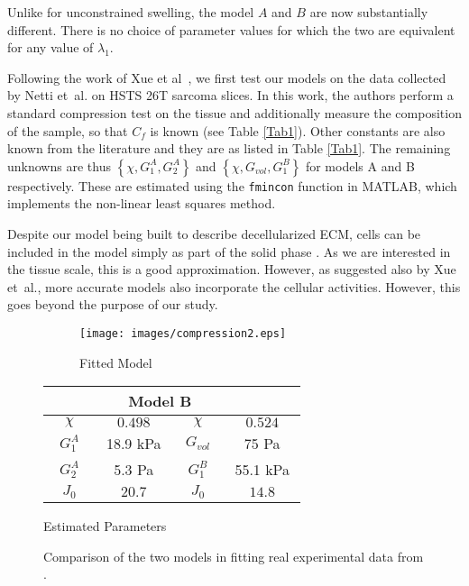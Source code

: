 Unlike for unconstrained swelling, the model $A$ and $B$ are now substantially different. There is no choice of parameter values for which the two are equivalent for any value of $\lambda_1$. 

Following the work of Xue et al~\cite{ecm2}, we first test our models on the data collected by Netti et~al. \cite{Netti} on HSTS 26T sarcoma slices. In this work, the authors perform a standard compression test on the tissue and additionally measure the composition of the sample, so that $C_f$ is known (see Table \ref{Tab1}). Other constants are also known from the literature and they are as listed in Table \ref{Tab1}. The remaining unknowns are thus $\left\{\chi, G^A_1, G^A_2\right\}$ and  $\left\{\chi, G_{vol}, G^B_1\right\}$ for models A and B respectively. These are estimated using the \texttt{fmincon} function in MATLAB, which implements the non-linear least squares method.

Despite our model being built to describe decellularized ECM, cells can be included in the model simply as part of the solid phase \cite{ecm2}. As we are interested in the tissue scale, this is a good approximation. However, as suggested also by Xue et~al.\cite{ecm2}, more accurate models also incorporate the cellular activities. However, this goes beyond the purpose of our study. 

\begin{figure}[h]
	\hspace{-8mm}
	\begin{subfigure}{0.62\textwidth}
		\hspace{2mm}
		\texttt{[image: images/compression2.eps]}
		\caption{Fitted Model}
		\label{fit}
	\end{subfigure}
	\begin{subtable}{0.375\textwidth}
		\begin{tabular}{c | c ||c| c }		
			\hline\addlinespace[2pt]
			\multicolumn{2}{c||}{Model A} &  \multicolumn{2}{c}{Model B}\\[0.5mm]
			\hline\addlinespace[2pt]
			$\quad \chi\quad$ & $\quad0.498\quad$ &$\quad \chi\quad$&$\quad0.524\quad$\\[0.5mm]
			$G^A_1$ & 18.9 kPa&$G_{vol}$&75 Pa\\[0.5mm]
			$G^A_2$ & 5.3 Pa&$G^{B}_{1}$& 55.1 kPa\\[0.5mm]
			$J_0$ & $20.7$&  $J_0$&$14.8$\\[0.5mm]
			\hline
		\end{tabular}
		\caption{Estimated Parameters}
		\label{param}
	\end{subtable}
	\caption{Comparison of the two models in fitting real experimental data from \cite{Netti}.}		
\end{figure}

